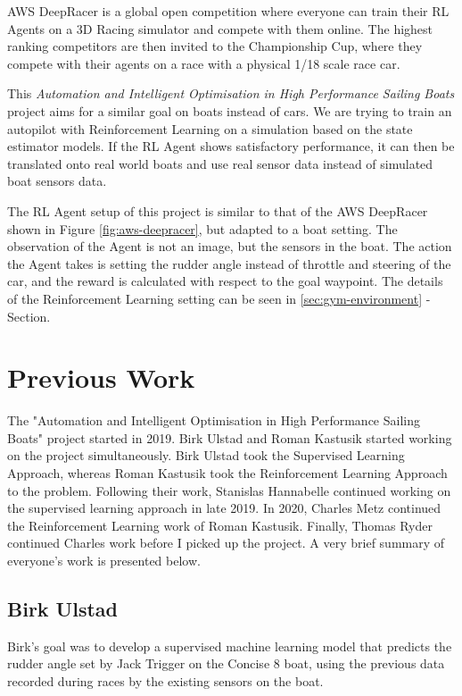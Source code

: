 \documentclass[12pt,twoside]{report}
\begin{document}
AWS DeepRacer is a global open competition where everyone can train their RL Agents on a 3D Racing simulator and compete with them online. The highest ranking competitors are then invited to the Championship Cup, where they compete with their agents on a race with a physical 1/18 scale race car.

This \textit{Automation and Intelligent Optimisation in High Performance Sailing Boats} project aims for a similar goal on boats instead of cars. We are trying to train an autopilot with Reinforcement Learning on a simulation based on the state estimator models. If the RL Agent shows satisfactory performance, it can then be translated onto real world boats and use real sensor data instead of simulated boat sensors data.

The RL Agent setup of this project is similar to that of the AWS DeepRacer shown in Figure \ref{fig:aws-deepracer}, but adapted to a boat setting. The observation of the Agent is not an image, but the sensors in the boat. The action the Agent takes is setting the rudder angle instead of throttle and steering of the car, and the reward is calculated with respect to the goal waypoint. The details of the Reinforcement Learning setting can be seen in \ref{sec:gym-environment} -  Section.


\section{Previous Work}
The "Automation and Intelligent Optimisation in High Performance Sailing Boats" project started in 2019. Birk Ulstad and Roman Kastusik started working on the project simultaneously. Birk Ulstad took the Supervised Learning Approach, whereas Roman Kastusik took the Reinforcement Learning Approach to the problem. Following their work, Stanislas Hannabelle continued working on the supervised learning approach in late 2019. In 2020, Charles Metz continued the Reinforcement Learning work of Roman Kastusik. Finally, Thomas Ryder continued Charles work before I picked up the project. A very brief summary of everyone's work is presented below.

\subsection{Birk Ulstad}
Birk's \cite{birk} goal was to develop a supervised machine learning model that predicts the rudder angle set by Jack Trigger on the Concise 8 boat, using the previous data recorded during races by the existing sensors on the boat.
\end{document}
